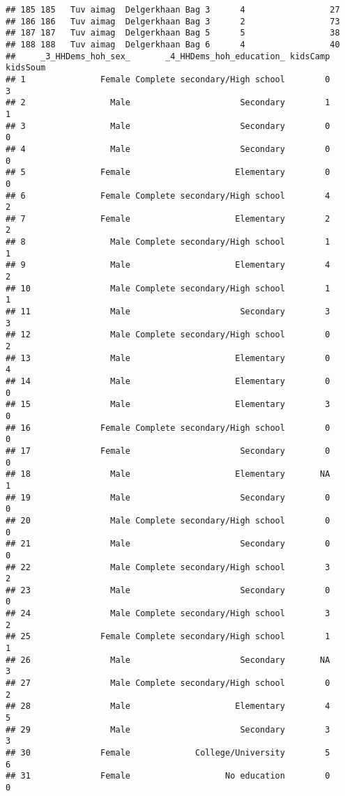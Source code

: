 \documentclass[
]{article}
\begin{document}
\begin{verbatim}
## 185 185   Tuv aimag  Delgerkhaan Bag 3      4                 27
## 186 186   Tuv aimag  Delgerkhaan Bag 3      2                 73
## 187 187   Tuv aimag  Delgerkhaan Bag 5      5                 38
## 188 188   Tuv aimag  Delgerkhaan Bag 6      4                 40
##     _3_HHDems_hoh_sex_       _4_HHDems_hoh_education_ kidsCamp kidsSoum
## 1               Female Complete secondary/High school        0        3
## 2                 Male                      Secondary        1        1
## 3                 Male                      Secondary        0        0
## 4                 Male                      Secondary        0        0
## 5               Female                     Elementary        0        0
## 6               Female Complete secondary/High school        4        2
## 7               Female                     Elementary        2        2
## 8                 Male Complete secondary/High school        1        1
## 9                 Male                     Elementary        4        2
## 10                Male Complete secondary/High school        1        1
## 11                Male                      Secondary        3        3
## 12                Male Complete secondary/High school        0        2
## 13                Male                     Elementary        0        4
## 14                Male                     Elementary        0        0
## 15                Male                     Elementary        3        0
## 16              Female Complete secondary/High school        0        0
## 17              Female                      Secondary        0        0
## 18                Male                     Elementary       NA        1
## 19                Male                      Secondary        0        0
## 20                Male Complete secondary/High school        0        0
## 21                Male                      Secondary        0        0
## 22                Male Complete secondary/High school        3        2
## 23                Male                      Secondary        0        0
## 24                Male Complete secondary/High school        3        2
## 25              Female Complete secondary/High school        1        1
## 26                Male                      Secondary       NA        3
## 27                Male Complete secondary/High school        0        2
## 28                Male                     Elementary        4        5
## 29                Male                      Secondary        3        3
## 30              Female             College/University        5        6
## 31              Female                   No education        0        0

\end{verbatim}
\end{document}
